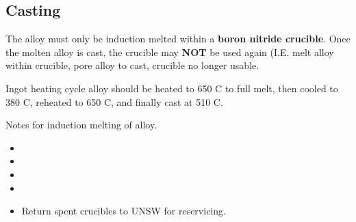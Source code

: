 \subsection{Casting}

The \MgZnCa alloy must only be induction melted within a \textbf{boron nitride crucible}. Once the molten alloy is cast, the crucible may \textbf{NOT} be used again (I.E. melt alloy within crucible, pore alloy to cast, crucible no longer usable. 

Ingot heating cycle
\MgZnCa alloy should be heated to 650 C to full melt, then cooled to 380 C, reheated to 650 C, and finally cast at 510 C. 

Notes for induction melting of \MgZnCa alloy.
\begin{itemize}
\item 
\item 
\item 
\item
\item Return spent crucibles to UNSW for reservicing. 
\end{itemize}